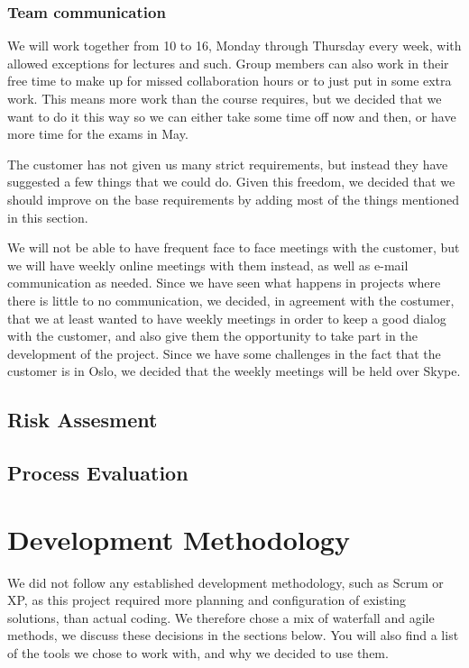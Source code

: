 \documentclass[12pt]{article}
\begin{document}
    
    
    \subsubsection {Team communication}
    We will work together from 10 to 16, Monday through Thursday every week, with allowed exceptions for lectures and such. Group members can also work in their free time to make up for missed collaboration hours or to just put in some extra work. This means more work than the course requires, but we decided that we want to do it this way so we can either take some time off now and then, or have more time for the exams in May.

    The customer has not given us many strict requirements, but instead they have suggested a few things that we could do. Given this freedom, we decided that we should improve on the base requirements by adding most of the things mentioned in this section.
    
    We will not be able to have frequent face to face meetings with the customer, but we will have weekly online meetings with them instead, as well as e-mail communication as needed. Since we have seen what happens in projects where there is little to no communication, we decided, in agreement with the costumer, that we at least wanted to have weekly meetings in order  to keep a good dialog with the customer, and also give them the opportunity to take part in the development of the project. Since we have some challenges in the fact that the customer is in Oslo, we decided that the weekly meetings will be held over Skype.
    
    \subsection{Risk Assesment}\label{risk}
    
    \subsection{Process Evaluation}\label{processevaluation}
    
\section{Development Methodology}\label{methodology} 
    We did not follow any established development methodology, such as Scrum or XP, as this project required more planning and configuration of existing solutions, than actual coding. We therefore chose a mix of waterfall and agile methods, we discuss these decisions in the sections below. You will also find a list of the tools we chose to work with, and why we decided to use them. 
    
\end{document}
